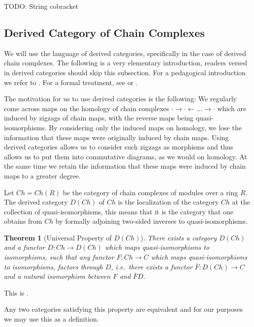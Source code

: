 \documentclass{scrartcl}
\theoremstyle{plain}
\newtheorem{theorem}{Theorem}[section]
\theoremstyle{definition}
\newcommand{\from}{\leftarrow}
\begin{document}
TODO: String cobracket

\subsection{Derived Category of Chain Complexes}

We will use the language of derived categories, specifically in the case of derived chain complexes. The following is a very elementary introduction, readers versed in derived categories should skip this subsection. For a pedagogical introduction we refer to \cite{thomas2001derived}. For a formal treatment, see \cite{gelfand2013methods} or \cite{weibel1994introduction}. 

The motivation for us to use derived categories is the following: We regularly come across maps on the homology of chain complexes $\cdot\to\cdot\from\dots\to\cdot$ which are induced by zigzags of chain maps, with the reverse maps being quasi-isomorphisms. By considering only the induced maps on homology, we lose the information that these maps were originally induced by chain maps. Using derived categories allows us to consider such zigzags as morphisms and thus allows us to put them into commutative diagrams, as we would on homology. At the same time we retain the information that these maps were induced by chain maps to a greater degree.

Let $Ch=Ch(R)$ be the category of chain complexes of modules over a ring $R$. 
The derived category $D(Ch)$ of $Ch$ is the localization of the category $Ch$ at the collection of quasi-isomorphisms, this means that it is the category that one obtains from $Ch$ by formally adjoining two-sided inverses to quasi-isomorphisms.

\begin{theorem}[Universal Property of $D(Ch)$]\label{thm:derived-universal-prop}
    There exists a category $D(Ch)$ and a functor $D\colon Ch\to D(Ch)$ which maps quasi-isomorphisms to isomorphisms, such that any functor $F\colon Ch\to C$ which maps quasi-isomorphisms to isomorphisms, factors through $D$, i.e.\ there exists a functor $\bar F\colon D(Ch)\to C$ and a natural isomorphism between $F$ and $\bar F D$. 
\end{theorem}
This is \cite[Thm III.2.1]{gelfand2013methods}.

Any two categories satisfying this property are equivalent and for our purposes we may use this as a definition. 
\end{document}
